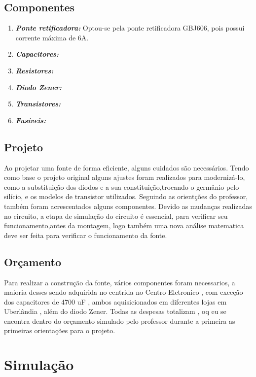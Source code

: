\documentclass[a4paper,12pt,oneside,openany,table,xcdraw]{article}
\begin{document}
\subsection{Componentes}
\begin{enumerate}[1 -]
    \item \textbf{\emph{Ponte retificadora:}} Optou-se pela ponte retificadora GBJ606, pois possui corrente máxima de 6A.
    \item \textbf{\emph{Capacitores:}}
    \item \textbf{\emph{Resistores:}}
    \item \textbf{\emph{Diodo Zener:}}
    \item \textbf{\emph{Transistores:}}
    \item \textbf{\emph{Fusíveis:}}

    
    
\end{enumerate}

\subsection{Projeto}
 
   Ao projetar uma fonte  de forma  eficiente, alguns cuidados são necessários. Tendo como base o projeto original alguns ajustes foram realizados para modernizá-lo, como a substituição dos diodos e a sua constituição,trocando o germânio pelo silício, e os modelos de transistor utilizados. Seguindo as orientções do professor, também foram acrescentados alguns componentes.
   Devido as mudanças realizadas no circuito, a etapa de simulação  do circuito é essencial, para verificar seu funcionamento,antes da montagem, logo também uma nova análise matematica deve ser feita para verificar o funcionamento da fonte.

   


\subsection{Orçamento}

Para realizar a construção da fonte, vários componentes foram necessarios, a maioria desses sendo adquirida no centrida no Centro  Eletronico , com exceção dos capacitores de 4700 uF , ambos aquisicionados em diferentes lojas em Uberlândia , além do diodo Zener.
Todas as despesas totalizam , oq eu se encontra dentro do orçamento simulado pelo professor durante a primeira  as primeiras orientações para o projeto.
\newpage
\section{Simulação}
\end{document}
